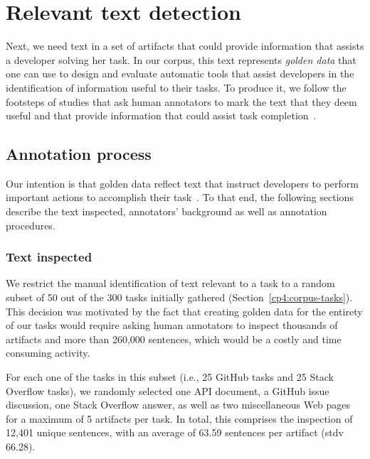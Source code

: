 


\section{Relevant text detection}
\label{cp4:corpus-relevant-text}




Next, we need text in a set of artifacts that could provide information that assists a developer solving her task.
In our corpus, this text represents \textit{golden data} that one can use to design and evaluate  
automatic tools that assist developers in the identification of  information useful to their tasks. 
To produce it, we follow the footsteps of studies that 
ask human annotators to
mark the text that they deem useful and that provide information that could assist task completion~\cite{nadi2020, Robillard2015, marques2020}.



\subsection{Annotation process}


Our intention is that golden data reflect text that instruct developers to perform important actions to accomplish their task~\cite{Robillard2015, Lotufo2012}.
To that end, the following sections describe the text inspected, annotators' background as well as annotation procedures.




\subsubsection{Text inspected}




We restrict the manual identification of text relevant to a task to a random subset of 
50  out of the 300  tasks initially gathered (Section~\ref{cp4:corpus-tasks}).
This decision was motivated by the fact that 
creating golden data for the entirety of our tasks 
would require asking human annotators to inspect thousands of artifacts and more than 260,000 sentences, which would be a costly and time consuming activity. 



For each one of the tasks in this subset (i.e., 25 GitHub tasks and 25 Stack Overflow tasks), we randomly selected 
one API document, a GitHub issue discussion, one Stack Overflow answer, as well as two  miscellaneous Web pages for a maximum of 5 artifacts per task.
In total, this comprises the inspection of  
12,401 unique sentences, with an average of 63.59 sentences per artifact (stdv 66.28).



